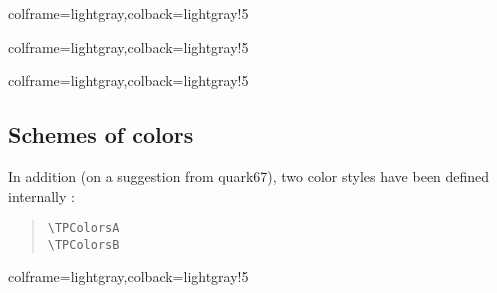 \documentclass[11pt,a4paper]{ltxdoc}
\begin{document}
\begin{tcblisting}{colframe=lightgray,colback=lightgray!5}
\BoardTrivialPursuit[Unit=0.5,Icons=false]
\BoardTrivialPursuit[Unit=0.5,Colors=false]
\end{tcblisting}

\begin{tcblisting}{colframe=lightgray,colback=lightgray!5}
\BoardTrivialPursuit[Unit=0.5,Blank]
\BoardTrivialPursuit[Unit=0.5,Logo=false,Center=false,IconJoker=\faAward]
\end{tcblisting}

\begin{tcblisting}{colframe=lightgray,colback=lightgray!5}
\BoardTrivialPursuit[%
	Jokers=false,%
	ListColors={%
		blue!25,red!25,teal!25,orange!25,gray!50,violet!25},%
	ListIcons={
		\faAddressCard,\faAngleDoubleRight,\faAngry[regular],%
		\faAtom,\faBalanceScaleLeft,\faBell}
]
\end{tcblisting}

\pagebreak

\subsection{Schemes of colors}

In addition (on a suggestion from \textsf{quark67}), two color styles have been defined internally :

\begin{quote}
\begin{verbatim}
\TPColorsA
\TPColorsB
\end{verbatim}
\end{quote}

\begin{tcblisting}{colframe=lightgray,colback=lightgray!5}
\BoardTrivialPursuit[Unit=0.5,ListColors=\TPColorsA]
\BoardTrivialPursuit[Unit=0.5,ListColors=\TPColorsB]
\end{tcblisting}
\end{document}
